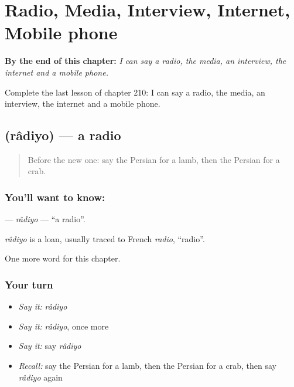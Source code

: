 
\chapter{Radio, Media, Interview, Internet, Mobile phone}
\label{ch:fa-radio-media-interview-internet-mobile-phone}

\begin{chapteropening}
\textbf{By the end of this chapter:} \emph{I can say a radio, the media, an interview, the internet and a mobile phone.}

Complete the last lesson of chapter 210: I can say a radio, the media, an interview, the internet and a mobile phone.
\end{chapteropening}

\section[\texorpdfstring{\fa{رادیو} (râdiyo)}{رادیو (râdiyo)}]{ (râdiyo) — a radio}

\label{lesson:FA-C210-radiyo}



\begin{quote}
Before the new one: say the Persian for a lamb, then the Persian for a crab.
\end{quote}

\subsection*{You'll want to know: }
\textbf{} — \emph{râdiyo} — \textquotedblleft{}a radio\textquotedblright{}.

\begin{cousinweb}
\emph{râdiyo} is a loan, usually traced to French \emph{radio}, \textquotedblleft{}radio\textquotedblright{}.
\end{cousinweb}

\begin{grammarlens}[title={What you've built}]
One more word for this chapter.
\end{grammarlens}

\subsection*{Your turn}
\begin{itemize}
\raggedright
  \item \emph{Say it:} \emph{râdiyo}
  \item \emph{Say it:} \emph{râdiyo}, once more
  \item \emph{Say it:} say \emph{râdiyo}
  \item \emph{Recall:} say the Persian for a lamb, then the Persian for a crab, then say \emph{râdiyo} again
\end{itemize}

